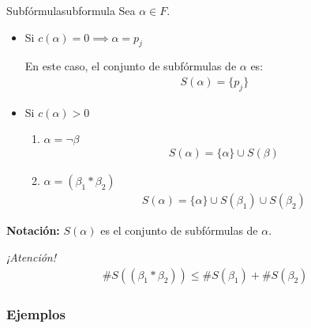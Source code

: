 \begin{definicion}{Subfórmula}{subformula}
    Sea $\alpha \in F$.

    \medskip

    \begin{itemize}
        \item {}%
            Si $c(\alpha) = 0 \implies \alpha = p_j $

            En este caso, el conjunto de subfórmulas de $\alpha$ es:
            \begin{gather*}
                S(\alpha)=\{ p_j \}
            \end{gather*}

        \item Si $c(\alpha) > 0$
            \begin{enumerate}
                \item $\alpha = \neg \beta$
                    \begin{gather*}
                        S(\alpha) = \{ \alpha \} \cup S(\beta)
                    \end{gather*}
                \item {}%
                    $\alpha = (\beta_1 * \beta_2)$
                    \begin{gather*}
                        S(\alpha)=\{ \alpha \}\cup S(\beta_1) \cup S(\beta_2)
                    \end{gather*}
            \end{enumerate}
    \end{itemize}

    \bigskip
    \textbf{Notación:}
    $S(\alpha)$ es el conjunto de subfórmulas de $\alpha$.
\end{definicion}

\bigskip
\textit{¡Atención!}
\begin{gather*}
    \# S((\beta_1 * \beta_2)) \leq \# S(\beta_1) + \# S(\beta_2)
\end{gather*}

\subsubsection{Ejemplos}

